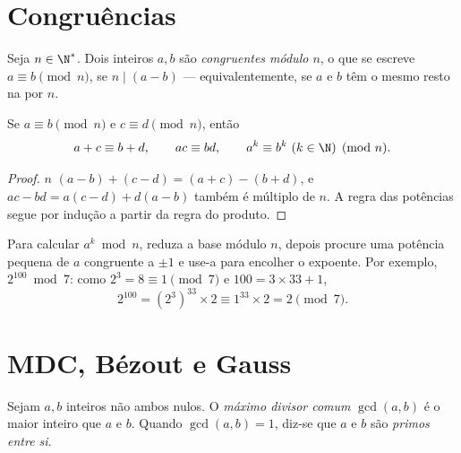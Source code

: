 \section{Congruências}

\begin{definition}[Congruência]\label{def:g12:arith:congruence}
Seja $n \in \N^*$. Dois inteiros $a, b$ são \emph{congruentes módulo
$n$}, o que se escreve $a \equiv b \pmod n$, se
$n \mid (a - b)$ --- equivalentemente, se $a$ e $b$ têm o mesmo resto na
 por $n$.
\end{definition}

\begin{proposition}\label{prop:g12:arith:congops}
Se $a \equiv b \pmod n$ e $c \equiv d \pmod n$, então
\[
a + c \equiv b + d, \qquad
ac \equiv bd, \qquad
a^k \equiv b^k \ (k \in \N) \pmod n .
\]
\end{proposition}

\begin{proof}
$n$  $(a-b) + (c-d) = (a+c) - (b+d)$, e
$ac - bd = a(c - d) + d(a - b)$ também é múltiplo de $n$. A regra das
potências segue por indução a partir da regra do produto.
\end{proof}

\begin{method}\label{met:g12:arith:powers}
Para calcular $a^k \bmod n$, reduza a base módulo $n$, depois procure uma
potência pequena de $a$ congruente a $\pm1$ e use-a para encolher o
expoente. Por exemplo, $2^{100} \bmod 7$: como
$2^3 = 8 \equiv 1 \pmod 7$ e $100 = 3\times33 + 1$,
\[
2^{100} = \left(2^{3}\right)^{33} \times 2 \equiv 1^{33}\times 2 = 2 \pmod 7 .
\]
\end{method}

\section{MDC, Bézout e Gauss}

\begin{definition}[MDC]\label{def:g12:arith:gcd}
Sejam $a, b$ inteiros não ambos nulos. O \emph{máximo divisor
comum} $\gcd(a, b)$ é o maior inteiro que  $a$ e $b$.
Quando $\gcd(a,b) = 1$, diz-se que $a$ e $b$ são \emph{primos entre
si}.
\end{definition}

